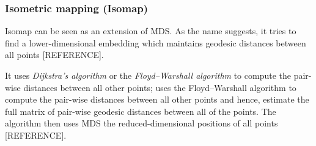 %	
%	


\hfill
\subsubsection{Isometric mapping (Isomap)}

Isomap can be seen as an extension of MDS. %
As the name suggests, it tries to find a lower-dimensional embedding which maintains geodesic distances between all points [REFERENCE].  

It uses \textit{Dijkstra's algorithm} or  the \textit{Floyd–Warshall algorithm} to compute the pair-wise distances between all other points;  uses the Floyd–Warshall algorithm to compute the pair-wise distances between all other points and hence, estimate the full matrix of pair-wise geodesic distances between all of the points. The algorithm then uses MDS the reduced-dimensional positions of all points [REFERENCE].


%

